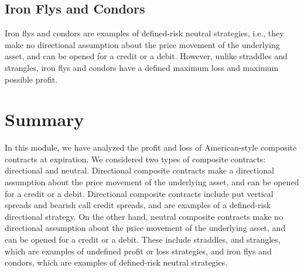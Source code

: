 \documentclass[11pt]{article}
\theoremstyle{definition}
\begin{document}
\subsection*{Iron Flys and Condors}
Iron flys and condors are examples of defined-risk neutral strategies, i.e., they make no directional assumption about the price movement of the underlying asset, and can be opened for a credit or a debit.
However, unlike straddles and strangles, iron flys and condors have a defined maximum loss and maximum possible profit.


\section*{Summary}
In this module, we have analyzed the profit and loss of American-style composite contracts at expiration.
We considered two types of composite contracts: directional and neutral.
Directional composite contracts make a directional assumption about the price movement of the underlying asset, and can be opened for a credit or a debit.
Directional composite contracts include put vertical spreads and bearish call credit spreads, and are examples of a defined-risk directional strategy.
On the other hand, neutral composite contracts make no directional assumption about the price movement of the underlying asset, and can be opened for a credit or a debit.
These include straddles, and strangles, which are examples of undefined profit or loss strategies, and iron flys and condors, which are examples of defined-risk neutral strategies.



\clearpage
\printindex
\end{document}
